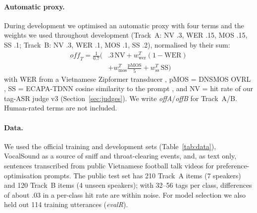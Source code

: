 \documentclass[11pt]{article}
\begin{document}
\paragraph{Automatic proxy.} During development we optimised an automatic proxy with four terms and the weights we
used throughout development (Track~A: NV .3, WER .15, MOS .15, SS .1; Track~B: NV .3, WER .1, MOS .1, SS .2),
normalised by their sum:
\begin{align*}
\textit{off}_T = \tfrac{1}{0.7}\big(&.3\,\mathrm{NV} + w^T_{\mathrm{wer}}(1{-}\mathrm{WER}) \\
&+ w^T_{\mathrm{mos}}\tfrac{\mathrm{pMOS}}{5} + w^T_{\mathrm{ss}}\,\mathrm{SS}\big)
\end{align*}
with WER from a Vietnamese Zipformer transducer \citep{yao2024zipformer,zipformervi}, pMOS = DNSMOS OVRL
\citep{reddy2022dnsmos}, SS = ECAPA-TDNN cosine similarity to the prompt \citep{desplanques2020ecapa,ravanelli2021speechbrain}, and NV = hit rate
of our tag-ASR judge v3 (Section~\ref{sec:judges}). We write \textit{offA}/\textit{offB} for Track~A/B. Human-rated
terms are not included.

\paragraph{Data.} We used the official training and development sets (Table~\ref{tab:data}), VocalSound
\citep{gong2022vocalsound} as a source of sniff and throat-clearing events, and, as text only, sentences transcribed from
public Vietnamese football talk videos for preference-optimisation prompts. The public test set has 210 Track~A items
(7 speakers) and 120 Track~B items (4 unseen speakers); with 32--56 tags per class, differences of about .03 in a
per-class hit rate are within noise. For model selection we also held out 114 training utterances (\emph{evalR}).

\begin{table}[t]
\centering\small
{}
\caption{Official ViNV-TTS data (tag counts per class).}
\label{tab:data}
\end{table}
\end{document}
